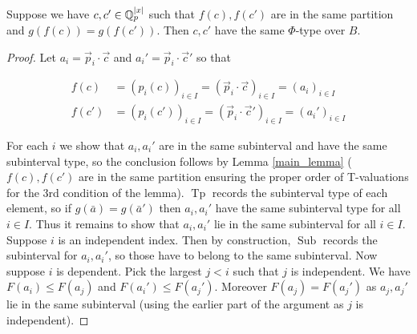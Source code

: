 \documentclass{amsart}
\DeclareMathOperator{\It}{Tp}
\DeclareMathOperator{\Sub}{Sub}
\begin{document}
\begin{Lemma}
  Suppose we have $c, c' \in \mathbb{Q}_p^{|x|}$ such that $f(c), f(c')$ are in the same partition and $g(f(c)) = g(f(c'))$.
  Then $c, c'$ have the same $\Phi$-type over $B$.
\end{Lemma}

\begin{proof}
  Let $a_i = \vec p_i \cdot \vec c$ and $a_i' = \vec p_i \cdot \vec c'$ so that

  \begin{align*}
    f(c) &= (p_i(c))_{i \in I} = (\vec p_i \cdot \vec c)_{i \in I} = (a_i)_{i \in I} \\
    f(c') &= (p_i(c'))_{i \in I} = (\vec p_i \cdot \vec c')_{i \in I} = (a_i')_{i \in I}
  \end{align*}

  For each $i$ we show that $a_i, a_i'$ are in the same subinterval and have the same subinterval type, so the conclusion follows by Lemma \ref{main_lemma}
  ($f(c), f(c')$ are in the same partition ensuring the proper order of T-valuations for the 3rd condition of the lemma).
  $\It$ records the subinterval type of each element, so if $g(\bar a) = g(\bar a')$ then $a_i, a_i'$ have the same subinterval type for all $i \in I$.
  Thus it remains to show that $a_i, a_i'$ lie in the same subinterval for all $i \in I$.
  Suppose $i$ is an independent index.
  Then by construction, $\Sub$ records the subinterval for $a_i, a_i'$, so those have to belong to the same subinterval.
  Now suppose $i$ is dependent.
  Pick the largest $j < i$ such that $j$ is independent.
  We have $F(a_i) \leq F(a_j)$ and $F(a_i') \leq F(a_j')$.
  Moreover $F(a_j) = F(a_j')$ as $a_j, a_j'$ lie in the same subinterval (using the earlier part of the argument as $j$ is independent).
  

\end{proof}
\end{document}
